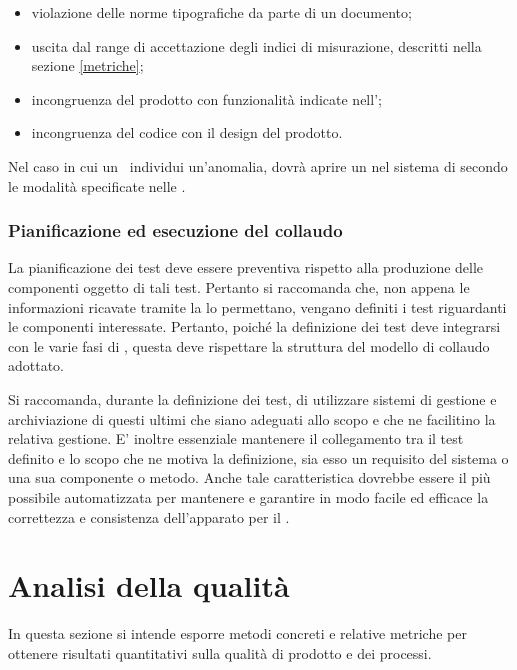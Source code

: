\documentclass[12pt,a4paper]{article}
\begin{document}
	\begin{itemize}
		\item violazione delle norme tipografiche da parte di un documento;
		\item uscita dal range di accettazione degli indici di misurazione, descritti nella sezione \ref{metriche};
		\item incongruenza del prodotto con funzionalità indicate nell'\AdR;
		\item incongruenza del codice con il design del prodotto.
	\end{itemize}
	
	Nel caso in cui un \VR\ individui un'anomalia, dovrà aprire un  nel sistema di  secondo le modalità specificate nelle \NdP.
	
	\subsubsection{Pianificazione ed esecuzione del collaudo}
	La pianificazione dei test deve essere preventiva rispetto alla produzione delle componenti oggetto di tali test. Pertanto si raccomanda che, non appena le informazioni ricavate tramite la  lo permettano, vengano definiti i test riguardanti le componenti interessate.
	Pertanto, poiché la definizione dei test deve integrarsi con le varie fasi di , questa deve rispettare la struttura del modello di collaudo adottato.	
	
	Si raccomanda, durante la definizione dei test, di utilizzare sistemi di gestione e archiviazione di questi ultimi che siano adeguati allo scopo e che ne facilitino la relativa gestione. E' inoltre essenziale mantenere il collegamento tra il test definito e lo scopo che ne motiva la definizione, sia esso un requisito del sistema o una sua componente o metodo. Anche tale caratteristica dovrebbe essere il più possibile automatizzata per mantenere e garantire in modo facile ed efficace la correttezza e consistenza dell'apparato per il .
	
	\newpage
	
	\section{Analisi della qualità}\label{analisi}
	
	In questa sezione si intende esporre metodi concreti e relative metriche per ottenere risultati quantitativi sulla qualità di prodotto e dei processi. 
	
\end{document}
